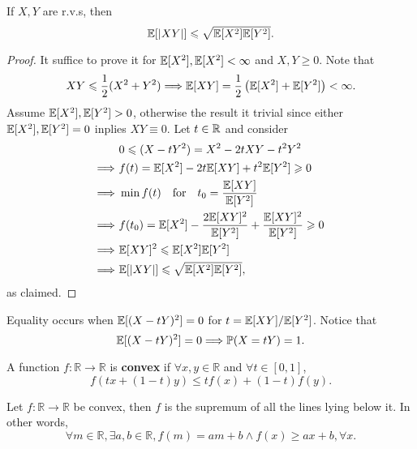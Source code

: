 \begin{proposition}\label{prop:Cauchy-Schwartz inequality}
    If $X,Y$ are r.v.s, then 
    \[
        {\mathbb{E}}[|XY|]\leqslant \sqrt{{\mathbb{E}}[X^2]{\mathbb{E}}[Y^2]}.
    \]
\end{proposition}
\begin{proof}
    It suffice to prove it for $ {\mathbb{E}}[X^2],{\mathbb{E}}[X^2]<\infty $ and $ X,Y\ge 0 $. Note that 
    \[
        XY\leqslant \frac{1}{2}(X^2+Y^2) \Longrightarrow {\mathbb{E}}[XY] = \frac{1}{2}\left( {\mathbb{E}}[X^2]+{\mathbb{E}}[Y^2] \right)<\infty .
    \]
    Assume $ {\mathbb{E}}[X^2],{\mathbb{E}}[Y^2]>0 $, otherwise the result it trivial since either $ {\mathbb{E}}[X^2],{\mathbb{E}}[Y^2]=0 $ inplies $XY\equiv 0$. Let $t\in {\mathbb{R}}$ and consider 
    \begin{align*}
        &\ 0\leqslant (X-tY^2) = X^2-2tXY-t^2Y^2\\ 
        \Longrightarrow &\  f(t) = {\mathbb{E}}[X^2]-2t{\mathbb{E}}[XY]+t^2{\mathbb{E}}[Y^2]\geqslant 0\\ 
        \Longrightarrow &\  \min f(t)\quad\text{for}\quad t_0 = \frac{{\mathbb{E}}[XY]}{{\mathbb{E}}[Y^2]} \\ 
        \Longrightarrow &\  f(t_0)={\mathbb{E}}[X^2]-\frac{2{\mathbb{E}}[XY]^2}{{\mathbb{E}}[Y^2]}+\frac{{\mathbb{E}}[XY]^2}{{\mathbb{E}}[Y^2]}\geqslant 0\\ 
        \Longrightarrow &\  {\mathbb{E}}[XY]^2\leqslant {\mathbb{E}}[X^2]{\mathbb{E}}[Y^2]\\ 
        \Longrightarrow &\  {\mathbb{E}}[|XY|]\leqslant \sqrt{{\mathbb{E}}[X^2]{\mathbb{E}}[Y^2]},
    \end{align*}
    as claimed.
\end{proof}
\begin{remark}
    Equality occurs when $ {\mathbb{E}}[(X-tY)^2]=0 $ for $ t={\mathbb{E}}[XY]/{\mathbb{E}}[Y^2] $. Notice that 
    \[
        {\mathbb{E}}[(X-tY)^2]=0 \Longrightarrow \mathbb{P}(X=tY)=1.
    \]
\end{remark}
\begin{definition}
    A function $ f:\mathbb{R} \to \mathbb{R} $ is \textbf{convex} if $ \forall x,y\in \mathbb{R}  $ and $ \forall t\in [0,1] $,
    \[
        f(tx+(1-t)y)\le tf(x)+(1-t)f(y).
    \]
\end{definition}
\begin{lemma}\label{lma:Jensen}
    Let $ f:\mathbb{R} \to \mathbb{R}  $ be convex, then $f$ is the supremum of all the lines lying below it. In other words,
    \[
        \forall m\in \mathbb{R}, \exists a,b\in \mathbb{R}, f(m)=am+b \land f(x)\ge ax+b,\forall x.
    \]
\end{lemma}
